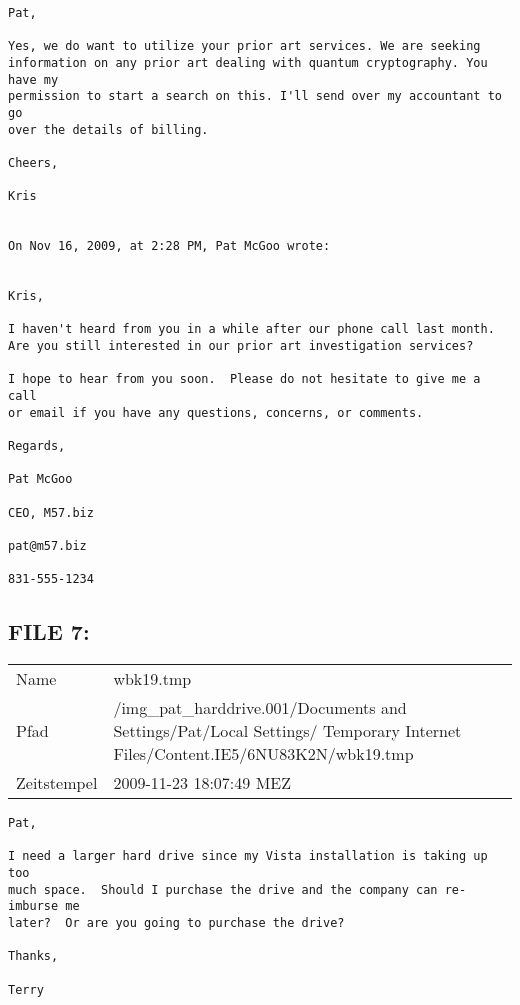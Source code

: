 \begin{lstlisting}
Pat,

Yes, we do want to utilize your prior art services. We are seeking 
information on any prior art dealing with quantum cryptography. You have my 
permission to start a search on this. I'll send over my accountant to go 
over the details of billing.

Cheers,

Kris


On Nov 16, 2009, at 2:28 PM, Pat McGoo wrote:


Kris,

I haven't heard from you in a while after our phone call last month. 
Are you still interested in our prior art investigation services?

I hope to hear from you soon.  Please do not hesitate to give me a call
or email if you have any questions, concerns, or comments.

Regards,

Pat McGoo

CEO, M57.biz

pat@m57.biz

831-555-1234

\end{lstlisting}
\newpage
\subsection{FILE 7:}
\label{sec:pat_emails_7}

\begin{table}[htb]
	\begin{tabular}{p{2cm} p{13.5cm}}
		Name & wbk19.tmp\\
		Pfad & /img_pat_harddrive.001/Documents and Settings/Pat/Local Settings/ Temporary Internet Files/Content.IE5/6NU83K2N/wbk19.tmp\\
		Zeitstempel & 2009-11-23 18:07:49 MEZ
	\end{tabular}
\end{table}	

\begin{lstlisting}
Pat,

I need a larger hard drive since my Vista installation is taking up too 
much space.  Should I purchase the drive and the company can re-imburse me 
later?  Or are you going to purchase the drive?

Thanks,

Terry

\end{lstlisting}

